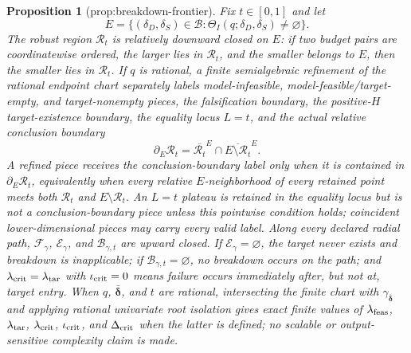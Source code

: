 \documentclass{article}
\newtheorem{proposition}{Proposition}
\begin{document}
\begin{proposition}[prop:breakdown-frontier]\label{prop:breakdown-frontier}
Fix \(t\in[0,1]\) and let
\[
 E=\{(\delta_D,\delta_S)\in\mathcal B:\Theta_I(q;\delta_D,\delta_S)\neq\varnothing\}.
\]
The robust region \(\mathcal R_t\) is relatively downward closed on \(E\): if two budget pairs are coordinatewise ordered, the larger lies in \(\mathcal R_t\), and the smaller belongs to \(E\), then the smaller lies in \(\mathcal R_t\). If \(q\) is rational, a finite semialgebraic refinement of the rational endpoint chart separately labels model-infeasible, model-feasible/target-empty, and target-nonempty pieces, the falsification boundary, the positive-\(H\) target-existence boundary, the equality locus \(L=t\), and the actual relative conclusion boundary
\[
 \partial_E\mathcal R_t
 =\overline{\mathcal R_t}^{E}
  \cap\overline{E\setminus\mathcal R_t}^{E}.
\]
A refined piece receives the conclusion-boundary label only when it is contained in \(\partial_E\mathcal R_t\), equivalently when every relative \(E\)-neighborhood of every retained point meets both \(\mathcal R_t\) and \(E\setminus\mathcal R_t\). An \(L=t\) plateau is retained in the equality locus but is not a conclusion-boundary piece unless this pointwise condition holds; coincident lower-dimensional pieces may carry every valid label. Along every declared radial path, \(\mathcal F_\gamma\), \(\mathcal E_\gamma\), and \(\mathcal B_{\gamma,t}\) are upward closed. If \(\mathcal E_\gamma=\varnothing\), the target never exists and breakdown is inapplicable; if \(\mathcal B_{\gamma,t}=\varnothing\), no breakdown occurs on the path; and \(\lambda_{\rm crit}=\lambda_{\rm tar}\) with \(\iota_{\rm crit}=0\) means failure occurs immediately after, but not at, target entry. When \(q\), \(\bar{\boldsymbol\delta}\), and \(t\) are rational, intersecting the finite chart with \(\gamma_{\bar{\boldsymbol\delta}}\) and applying rational univariate root isolation gives exact finite values of \(\lambda_{\rm feas}\), \(\lambda_{\rm tar}\), \(\lambda_{\rm crit}\), \(\iota_{\rm crit}\), and \(\Delta_{\rm crit}\) when the latter is defined; no scalable or output-sensitive complexity claim is made.
\end{proposition}
\end{document}
